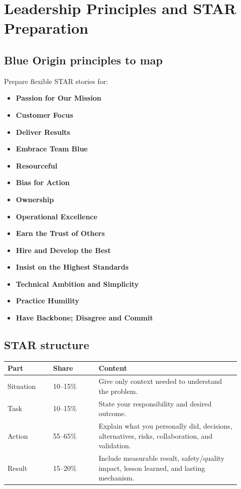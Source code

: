\documentclass[11pt]{article}
\newcommand{\principle}[1]{\textbf{\textcolor{BOBlue}{#1}}}
\begin{document}
\section{Leadership Principles and STAR Preparation}

\subsection{Blue Origin principles to map}
Prepare flexible STAR stories for:
\begin{itemize}
  \item \principle{Passion for Our Mission}
  \item \principle{Customer Focus}
  \item \principle{Deliver Results}
  \item \principle{Embrace Team Blue}
  \item \principle{Resourceful}
  \item \principle{Bias for Action}
  \item \principle{Ownership}
  \item \principle{Operational Excellence}
  \item \principle{Earn the Trust of Others}
  \item \principle{Hire and Develop the Best}
  \item \principle{Insist on the Highest Standards}
  \item \principle{Technical Ambition and Simplicity}
  \item \principle{Practice Humility}
  \item \principle{Have Backbone; Disagree and Commit}
\end{itemize}

\subsection{STAR structure}
\begin{longtable}{p{0.18\linewidth}p{0.18\linewidth}p{0.56\linewidth}}
\toprule
\textbf{Part} & \textbf{Share} & \textbf{Content} \\
\midrule
Situation & 10--15\% & Give only context needed to understand the problem. \\
Task & 10--15\% & State your responsibility and desired outcome. \\
Action & 55--65\% & Explain what you personally did, decisions, alternatives, risks, collaboration, and validation. \\
Result & 15--20\% & Include measurable result, safety/quality impact, lesson learned, and lasting mechanism. \\
\bottomrule
\end{longtable}
\end{document}
